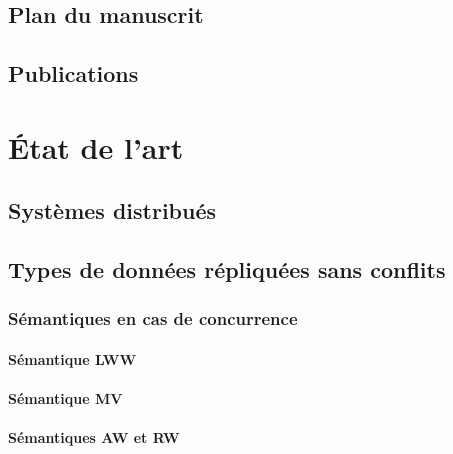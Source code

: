 \documentclass[12pt]{thesul}
\begin{document}
\section{Plan du manuscrit}
\section{Publications}

\NumberThisInToc
\chapter{État de l'art}
\minitoc

\section{Systèmes distribués}


% 

\section{Types de données répliquées sans conflits}


\subsection{Sémantiques en cas de concurrence}


\subsubsection{Sémantique \acl{LWW}}


\subsubsection{Sémantique \acl{MV}}


\subsubsection{Sémantiques \acl{AW} et \acl{RW}}

\end{document}
